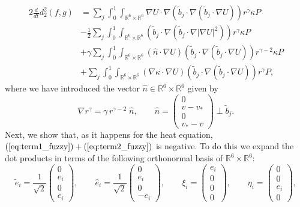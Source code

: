 \documentclass[10pt,oneside]{amsart}
\numberwithin{equation}{section}
\numberwithin{definition}{section}
\numberwithin{theorem}{section}
\numberwithin{lemma}{section}
\begin{document}
% 
\begin{align}
  2\frac{d}{dt}d_{2}^{2}(f,g) & 
  =\sum_{j}\int_{0}^{1}\int_{\mathbb R^6\times \mathbb R^6}\nabla U\cdot\nabla\left(\tilde{b}_{j}\cdot\nabla\left(\tilde{b}_{j}\cdot\nabla U\right)\right) r^\gamma \kappa P
  \label{eq:term1_fuzzy}\\
  & -\frac{1}{2}\sum_{j}\int_{0}^{1}\int_{\mathbb R^6\times \mathbb R^6}\left(\tilde{b}_{j}\cdot\nabla\left(\tilde{b}_{j}\cdot\nabla\left|\nabla U\right|^{2}\right)\right) r^\gamma \kappa P \label{eq:term2_fuzzy}\\
  & +\gamma\sum_{j}\int_{0}^{1}\int_{\mathbb R^6\times \mathbb R^6}\left(\hat{n}\cdot\nabla U\right)\left(\tilde{b}_{j}\cdot\nabla\left(\tilde{b}_{j}\cdot\nabla U\right)\right)r^{\gamma-2}\kappa P\nonumber \\
  & +\sum_{j}\int_{0}^{1}\int_{\mathbb R^6\times \mathbb R^6}\left(\nabla \kappa\cdot\nabla U\right)\left(\tilde{b}_{j}\cdot\nabla\left(\tilde{b}_{j}\cdot\nabla U\right)\right) r^\gamma P,\nonumber 
\end{align}
% 
where we have introduced the vector $\hat n\in \mathbb R^6\times \mathbb R^6$ given by
%
\begin{equation*}
  \nabla r^\gamma=\gamma\, r^{\gamma-2}\;\hat{n},\qquad\hat{n}=\begin{pmatrix}0\\
  v-v_*\\
  0\\
  v_*-v
  \end{pmatrix}\perp\tilde{b}_{j}.
\end{equation*}
% 
Next, we show that, as it happens for the heat equation, $(\ref{eq:term1_fuzzy})+(\ref{eq:term2_fuzzy})$ is negative. To do this we expand the dot products in terms of the following orthonormal basis of $\mathbb R^6\times \mathbb R^6$:
%
\begin{equation*}
  \tilde{e}_{i}=
  \frac{1}{\sqrt 2}\begin{pmatrix}0\\
  e_{i}\\
  0\\
  e_{i}
  \end{pmatrix},\qquad
  \hat{e}_{i}= \frac{1}{\sqrt 2}\begin{pmatrix}0\\
  e_{i}\\
  0\\
  -e_{i}
  \end{pmatrix},\qquad \xi_i=\begin{pmatrix}e_{i}\\
  0\\
  0\\
  0
  \end{pmatrix},\qquad \eta_i=\begin{pmatrix}0\\
  0\\
  e_{i}\\
  0
  \end{pmatrix},
\end{equation*}
\end{document}
